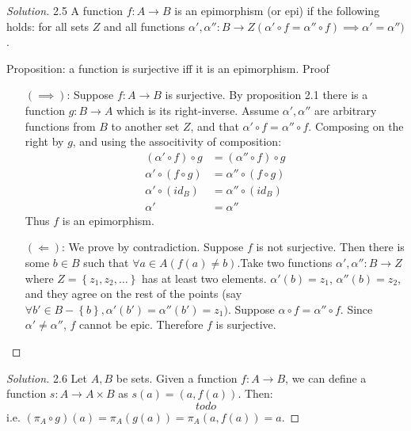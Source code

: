 \documentclass{article}
\theoremstyle{definition}
\newcommand{\set}[1]{\left\{#1\right\}}
\theoremstyle{definition}
\newenvironment{solution}{%
  \begin{proof}[Solution]
  \vspace{-8px}
  \setlength{\parskip}{4px}
  \setlength{\parindent}{0px}
}{
  \end{proof}
}
\begin{document}
\begin{solution}
2.5 A function $f\colon A \to B$ is an epimorphism (or epi) if the following holds:
for all sets $Z$ and all functions $\alpha', \alpha''\colon B \to Z (\alpha' \circ f = \alpha'' \circ f) \implies \alpha' = \alpha'')$.

Proposition: a function is surjective iff it is an epimorphism.
Proof
\begin{itemize}
\item[$(\implies)$:] Suppose $f\colon A \to B$ is surjective. By proposition 2.1 there is a function $g\colon B \to A$ which is its right-inverse. Assume $\alpha',\alpha''$ are arbitrary functions from $B$ to another set $Z$, and that $\alpha' \circ f = \alpha'' \circ f$.
Composing on the right by $g$, and using the associtivity of composition:
\begin{align*}
(\alpha' \circ f)\circ g &= (\alpha''\circ f)\circ g \\
\alpha' \circ (f\circ g) &= \alpha''\circ (f\circ g) \\
\alpha' \circ (id_B) &= \alpha''\circ (id_B) \\
\alpha' &= \alpha''
\end{align*}
Thus $f$ is an epimorphism.
\item[$(\Longleftarrow)$:] We prove by contradiction. Suppose $f$ is not
surjective. Then there is some $b \in B$ such that $\forall a \in A (f(a) \neq
b)$.Take two functions $\alpha', \alpha''\colon B \to Z$ where $Z =
\set{z_1,z_2,\dots}$ has at least two elements. $\alpha'(b) = z_1$,
$\alpha''(b) = z_2$, and they agree on the rest of the points (say $\forall b' \in B - \set{b}, \alpha'(b') = \alpha''(b') = z_1)$.
Suppose $\alpha \circ f = \alpha'' \circ f$. Since $\alpha' \neq \alpha''$, $f$
cannot be epic. Therefore $f$ is surjective.
\end{itemize}
\end{solution}

\begin{solution}
2.6 Let $A, B$ be sets. Given a function $f\colon A\to B$, we can define a function $s\colon A \to A \times B$ as $s(a) = (a, f(a))$. Then:
\[ todo \]
i.e. $(\pi_A \circ g)(a) = \pi_A(g(a)) = \pi_A(a, f(a)) = a$.
\end{solution}
\end{document}
